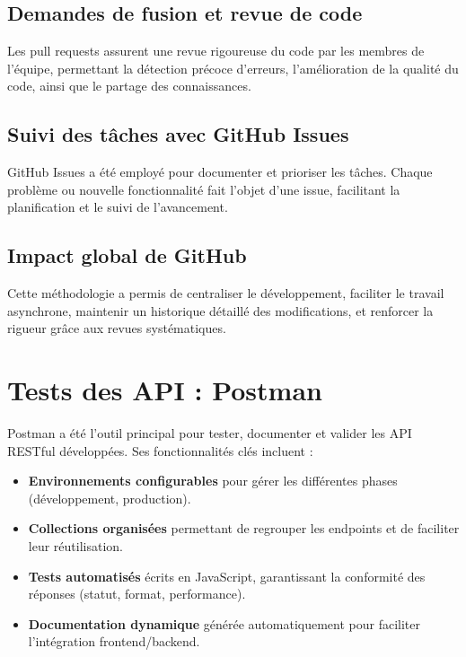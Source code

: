 \documentclass{rapportPfe}
\begin{document}
\subsection{Demandes de fusion et revue de code}

Les pull requests assurent une revue rigoureuse du code par les membres de l’équipe, permettant la détection précoce d’erreurs, l’amélioration de la qualité du code, ainsi que le partage des connaissances.

\subsection{Suivi des tâches avec GitHub Issues}

GitHub Issues a été employé pour documenter et prioriser les tâches. Chaque problème ou nouvelle fonctionnalité fait l’objet d’une issue, facilitant la planification et le suivi de l’avancement.

\subsection{Impact global de GitHub}

Cette méthodologie a permis de centraliser le développement, faciliter le travail asynchrone, maintenir un historique détaillé des modifications, et renforcer la rigueur grâce aux revues systématiques.

\section{Tests des API : Postman}

Postman a été l’outil principal pour tester, documenter et valider les API RESTful développées. Ses fonctionnalités clés incluent :

\begin{itemize}
    \item \textbf{Environnements configurables} pour gérer les différentes phases (développement, production).
    \item \textbf{Collections organisées} permettant de regrouper les endpoints et de faciliter leur réutilisation.
    \item \textbf{Tests automatisés} écrits en JavaScript, garantissant la conformité des réponses (statut, format, performance).
    \item \textbf{Documentation dynamique} générée automatiquement pour faciliter l’intégration frontend/backend.
\end{itemize}
\end{document}
